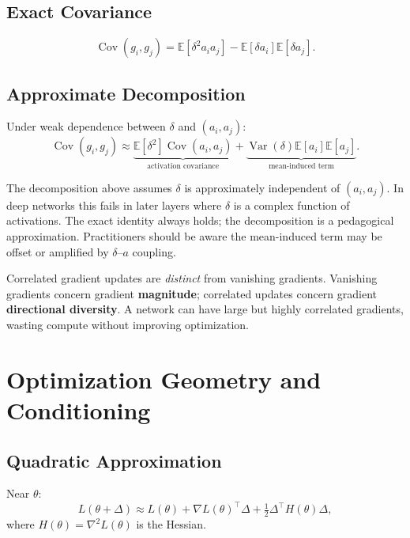 \documentclass[12pt,a4paper]{article}
\theoremstyle{definition}
\theoremstyle{remark}
\newcommand{\E}{\mathbb{E}}
\newcommand{\Var}{\operatorname{Var}}
\newcommand{\Cov}{\operatorname{Cov}}
\begin{document}
\subsection{Exact Covariance}

\[
\Cov(g_i, g_j) = \E[\delta^2 a_i a_j] - \E[\delta a_i]\E[\delta a_j].
\]

\subsection{Approximate Decomposition}

Under weak dependence between $\delta$ and $(a_i, a_j)$:
\[
\Cov(g_i,g_j) \approx \underbrace{\E[\delta^2]\Cov(a_i,a_j)}_{\text{activation covariance}} + \underbrace{\Var(\delta)\E[a_i]\E[a_j]}_{\text{mean-induced term}}.
\]

\begin{critbox}
The decomposition above assumes $\delta$ is approximately independent of $(a_i,a_j)$. In deep networks this fails in later layers where $\delta$ is a complex function of activations. The exact identity always holds; the decomposition is a pedagogical approximation. Practitioners should be aware the mean-induced term may be offset or amplified by $\delta$--$a$ coupling.
\end{critbox}

\begin{critbox}
Correlated gradient updates are \emph{distinct} from vanishing gradients. Vanishing gradients concern gradient \textbf{magnitude}; correlated updates concern gradient \textbf{directional diversity}. A network can have large but highly correlated gradients, wasting compute without improving optimization.
\end{critbox}

\section{Optimization Geometry and Conditioning}

\subsection{Quadratic Approximation}

Near $\theta$:
\[
L(\theta + \Delta) \approx L(\theta) + \nabla L(\theta)^\top \Delta + \tfrac{1}{2}\Delta^\top H(\theta)\Delta,
\]
where $H(\theta) = \nabla^2 L(\theta)$ is the Hessian.
\end{document}
